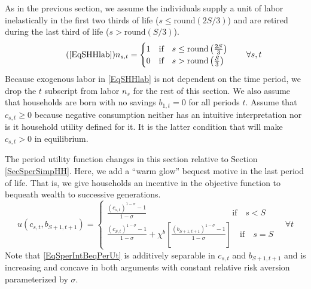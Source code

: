 \documentclass[letterpaper,12pt]{article}
\theoremstyle{definition}
\numberwithin{equation}{section}
\numberwithin{exercise}{section}
\begin{document}
\begin{spacing}{1.5}
      As in the previous section, we assume the individuals supply a unit of labor inelastically in the first two thirds of life ($s\leq \text{round}(2S/3)$) and are retired during the last third of life ($s>\text{round}(S/3)$).
      \begin{equation}\tag{\ref{EqSHHlab}}
         n_{s,t} = \begin{cases}
                      1\quad\text{if}\quad s\leq \text{round}\left(\frac{2S}{3}\right) \\
                      0\quad\text{if}\quad s> \text{round}\left(\frac{S}{3}\right)
                   \end{cases} \quad\forall s,t
      \end{equation}
      Because exogenous labor in \eqref{EqSHHlab} is not dependent on the time period, we drop the $t$ subscript from labor $n_s$ for the rest of this section. We also assume that households are born with no savings $b_{1,t} = 0$ for all periods $t$. Assume that $c_{s,t}\geq 0$ because negative consumption neither has an intuitive interpretation nor is it household utility defined for it. It is the latter condition that will make $c_{s,t}>0$ in equilibrium.

      The period utility function changes in this section relative to Section \ref{SecSperSimpHH}. Here, we add a ``warm glow'' bequest motive in the last period of life. That is, we give households an incentive in the objective function to bequeath wealth to successive generations.
      \begin{equation}\label{EqSperIntBeqPerUt}
         u(c_{s,t},b_{S+1,t+1}) =
            \begin{cases}
               \frac{(c_{s,t})^{1-\sigma} - 1}{1-\sigma} \qquad\qquad\qquad\qquad\qquad\:\text{if}\quad s<S \\
               \frac{(c_{S,t})^{1-\sigma} - 1}{1-\sigma} + \chi^b\left[\frac{(b_{S+1,t+1})^{1-\sigma} - 1}{1-\sigma}\right]\quad\text{if}\quad s=S
            \end{cases}\quad\forall t
      \end{equation}
      Note that \eqref{EqSperIntBeqPerUt} is additively separable in $c_{s,t}$ and $b_{S+1,t+1}$ and is increasing and concave in both arguments with constant relative risk aversion parameterized by $\sigma$.


\end{spacing}
\end{document}

